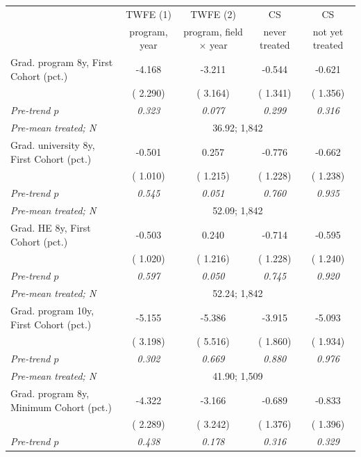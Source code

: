 \begin{tabular}{lcccc}
\toprule
 & TWFE (1) & TWFE (2) & CS & CS \\
 & program, year & program, field \(\times\) year & never treated & not yet treated \\
\midrule
Grad. program 8y, First Cohort (pct.) &  -4.168\sym{*} &  -3.211 &  -0.544 &  -0.621 \\
 & ( 2.290) & ( 3.164) & ( 1.341) & ( 1.356) \\
\quad \textit{Pre-trend \(p\)} & \textit{0.323} & \textit{0.077} & \textit{0.299} & \textit{0.316} \\
\quad \textit{Pre-mean treated; N} & \multicolumn{4}{c}{\scriptsize   36.92;  1,842} \\
\addlinespace
Grad. university 8y, First Cohort (pct.) &  -0.501 &   0.257 &  -0.776 &  -0.662 \\
 & ( 1.010) & ( 1.215) & ( 1.228) & ( 1.238) \\
\quad \textit{Pre-trend \(p\)} & \textit{0.545} & \textit{0.051} & \textit{0.760} & \textit{0.935} \\
\quad \textit{Pre-mean treated; N} & \multicolumn{4}{c}{\scriptsize   52.09;  1,842} \\
\addlinespace
Grad. HE 8y, First Cohort (pct.) &  -0.503 &   0.240 &  -0.714 &  -0.595 \\
 & ( 1.020) & ( 1.216) & ( 1.228) & ( 1.240) \\
\quad \textit{Pre-trend \(p\)} & \textit{0.597} & \textit{0.050} & \textit{0.745} & \textit{0.920} \\
\quad \textit{Pre-mean treated; N} & \multicolumn{4}{c}{\scriptsize   52.24;  1,842} \\
\addlinespace
Grad. program 10y, First Cohort (pct.) &  -5.155 &  -5.386 &  -3.915\sym{**} &  -5.093\sym{***} \\
 & ( 3.198) & ( 5.516) & ( 1.860) & ( 1.934) \\
\quad \textit{Pre-trend \(p\)} & \textit{0.302} & \textit{0.669} & \textit{0.880} & \textit{0.976} \\
\quad \textit{Pre-mean treated; N} & \multicolumn{4}{c}{\scriptsize   41.90;  1,509} \\
\addlinespace
Grad. program 8y, Minimum Cohort (pct.) &  -4.322\sym{*} &  -3.166 &  -0.689 &  -0.833 \\
 & ( 2.289) & ( 3.242) & ( 1.376) & ( 1.396) \\
\quad \textit{Pre-trend \(p\)} & \textit{0.438} & \textit{0.178} & \textit{0.316} & \textit{0.329} \\

\end{tabular}

